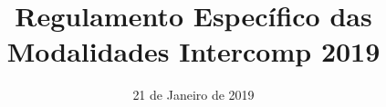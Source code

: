 \documentclass[11pt]{report}
\title{Regulamento Específico das Modalidades Intercomp 2019}
\date{21 de Janeiro de 2019}
\begin{document}





\noindent
\tableofcontents
\newpage


























\end{document}
